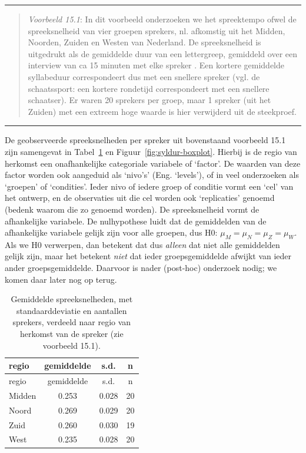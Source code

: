 \documentclass[
]{book}
\begin{document}
\begin{center}\rule{0.5\linewidth}{0.5pt}\end{center}

\begin{quote}
\emph{Voorbeeld 15.1}: In dit voorbeeld
onderzoeken we het spreektempo ofwel de spreeksnelheid van vier groepen
sprekers, nl. afkomstig uit het Midden, Noorden, Zuiden en Westen van
Nederland. De spreeksnelheid is uitgedrukt als de gemiddelde duur van
een lettergreep, gemiddeld over een interview van ca 15 minuten met elke
spreker \citep{Quene08} \citep{R-hqmisc}. Een kortere gemiddelde syllabeduur correspondeert
dus met een snellere spreker (vgl. de schaatssport: een kortere
rondetijd correspondeert met een snellere schaatser). Er waren 20
sprekers per groep, maar 1 spreker (uit het Zuiden) met een extreem hoge
waarde is hier verwijderd uit de steekproef.
\end{quote}

\begin{center}\rule{0.5\linewidth}{0.5pt}\end{center}

De geobserveerde spreeksnelheden per spreker uit bovenstaand voorbeeld 15.1
zijn samengevat in Tabel~\ref{tab:syldur} en
Figuur~\ref{fig:syldur-boxplot}. Hierbij is de regio van herkomst een
onafhankelijke categoriale variabele of `factor'. De waarden van deze
factor worden ook aangeduid als `nivo's' (Eng. `levels'), of in veel
onderzoeken als `groepen' of `condities'. Ieder nivo of iedere groep of
conditie vormt een `cel' van het ontwerp, en de observaties uit die cel
worden ook `replicaties' genoemd (bedenk waarom die zo genoemd worden).
De spreeksnelheid vormt de afhankelijke variabele. De nulhypothese luidt
dat de gemiddelden van de afhankelijke variabele gelijk zijn voor alle
groepen, dus H0: \(\mu_M = \mu_N = \mu_Z = \mu_W\). Als we H0 verwerpen,
dan betekent dat dus \emph{alleen} dat niet alle gemiddelden gelijk zijn,
maar het betekent \emph{niet} dat ieder groepsgemiddelde afwijkt van ieder
ander groepsgemiddelde. Daarvoor is nader (post-hoc) onderzoek nodig; we
komen daar later nog op terug.

\begin{longtable}[]{@{}lccc@{}}
\caption{\label{tab:syldur} Gemiddelde spreeksnelheden, met standaarddeviatie en aantallen sprekers, verdeeld naar regio van herkomst van de spreker (zie voorbeeld 15.1).}\tabularnewline
\toprule
regio & gemiddelde & s.d. & n\tabularnewline
\midrule
\endfirsthead
\toprule
regio & gemiddelde & s.d. & n\tabularnewline
\midrule
\endhead
Midden & 0.253 & 0.028 & 20\tabularnewline
Noord & 0.269 & 0.029 & 20\tabularnewline
Zuid & 0.260 & 0.030 & 19\tabularnewline
West & 0.235 & 0.028 & 20\tabularnewline
\bottomrule
\end{longtable}
\end{document}
